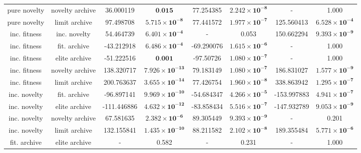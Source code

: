 \begin{tabular}{cccccccc}
   pure novelty & novelty archive &      36.000119 &                 $\textbf{0.015}$ &   77.254385 &  $\mathbf{2.242 \times 10^{-8}}$ &           - &                            1.000 \\
   pure novelty &   limit archive &      97.498708 &  $\mathbf{5.715 \times 10^{-8}}$ &   77.441572 &  $\mathbf{1.977 \times 10^{-7}}$ &  125.560413 &  $\mathbf{6.528 \times 10^{-4}}$ \\
   inc. fitness &    inc. novelty &      54.464739 &  $\mathbf{6.401 \times 10^{-4}}$ &           - &                            0.053 &  150.662294 &  $\mathbf{9.393 \times 10^{-9}}$ \\
   inc. fitness &    fit. archive &     -43.212918 &  $\mathbf{6.486 \times 10^{-4}}$ &  -69.290076 &  $\mathbf{1.615 \times 10^{-6}}$ &           - &                            1.000 \\
   inc. fitness &   elite archive &     -51.222516 &                 $\textbf{0.001}$ &   -97.50726 &  $\mathbf{1.080 \times 10^{-7}}$ &           - &                            1.000 \\
   inc. fitness & novelty archive &     138.320717 & $\mathbf{7.926 \times 10^{-13}}$ &   79.183149 &  $\mathbf{1.080 \times 10^{-7}}$ &  186.831027 &  $\mathbf{1.577 \times 10^{-9}}$ \\
   inc. fitness &   limit archive &     200.763637 & $\mathbf{3.655 \times 10^{-14}}$ &   77.426754 &  $\mathbf{1.960 \times 10^{-8}}$ &  338.863942 &  $\mathbf{1.295 \times 10^{-7}}$ \\
   inc. novelty &    fit. archive &     -96.897141 & $\mathbf{9.969 \times 10^{-10}}$ &  -54.684347 &  $\mathbf{4.266 \times 10^{-5}}$ & -153.997883 &  $\mathbf{4.941 \times 10^{-7}}$ \\
   inc. novelty &   elite archive &    -111.446886 & $\mathbf{4.632 \times 10^{-12}}$ &  -83.858434 &  $\mathbf{5.516 \times 10^{-7}}$ & -147.932789 &  $\mathbf{9.053 \times 10^{-9}}$ \\
   inc. novelty & novelty archive &      67.581635 &  $\mathbf{2.382 \times 10^{-6}}$ &   89.305449 &  $\mathbf{9.393 \times 10^{-9}}$ &           - &                            0.201 \\
   inc. novelty &   limit archive &     132.155841 & $\mathbf{1.435 \times 10^{-10}}$ &   88.211582 &  $\mathbf{2.102 \times 10^{-8}}$ &  189.355484 &  $\mathbf{5.771 \times 10^{-6}}$ \\
   fit. archive &   elite archive &              - &                            0.582 &           - &                            0.231 &           - &                            1.000 \\

\end{tabular}
